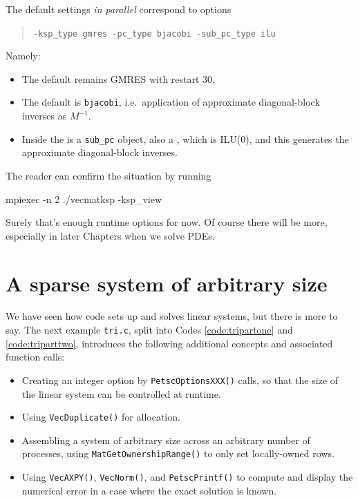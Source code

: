 The default \PETSc \pKSP settings \emph{in parallel} correspond to options
\begin{quote}
\texttt{-ksp\_type gmres -pc\_type bjacobi -sub\_pc\_type ilu}
\end{quote}
Namely:
\begin{itemize}
\item The default \pKSP remains GMRES with restart 30.
\item The default \pPC is \texttt{bjacobi}, i.e.~application of approximate diagonal-block inverses as $M^{-1}$.
\item Inside the \pPC is a \texttt{sub\_pc} object, also a \pPC, which is ILU($0$), and this generates the approximate diagonal-block inverses.
\end{itemize}
The reader can confirm the situation by running
\begin{cline}
mpiexec -n 2 ./vecmatksp -ksp_view
\end{cline}

Surely that's enough runtime options for now.  Of course there will be more, especially in later Chapters when we solve PDEs.


\section{A sparse system of arbitrary size}

We have seen how \PETSc code sets up and solves linear systems, but there is more to say.  The next example \texttt{tri.c}, split into Codes \ref{code:tripartone} and \ref{code:triparttwo}, introduces the following additional concepts and associated function calls:
\begin{itemize}
\item Creating an integer option by \texttt{PetscOptionsXXX()} calls, so that the size of the linear system can be controlled at runtime.
\item Using \texttt{VecDuplicate()} for allocation.
\item Assembling a system of arbitrary size across an arbitrary number of processes, using \texttt{MatGetOwnershipRange()} to only set locally-owned rows.
\item Using \texttt{VecAXPY()}, \texttt{VecNorm()}, and \texttt{PetscPrintf()} to compute and display the numerical error in a case where the exact solution is known.
\end{itemize}

